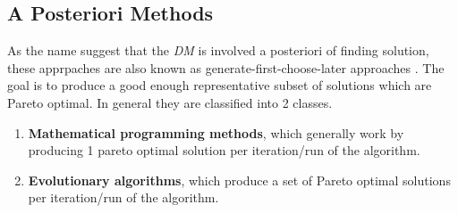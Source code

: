 \subsection{A Posteriori Methods} \label{a_posteriori_method}
As the name suggest that the \textit{DM} is involved a posteriori of finding solution, these apprpaches are also known as generate-first-choose-later approaches \cite{messac2002generating}. The goal is to produce a good enough representative subset of solutions which are Pareto optimal. In general they are classified into 2 classes.

\begin{enumerate}
    \item \textbf{Mathematical programming methods}, which generally work by producing 1 pareto optimal solution per iteration/run of the algorithm.
    \item \textbf{Evolutionary algorithms}, which produce a set of Pareto optimal solutions per iteration/run of the algorithm.
\end{enumerate}

